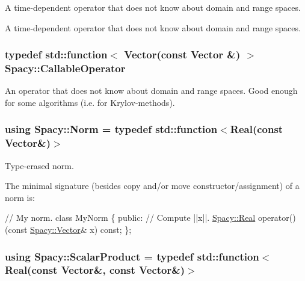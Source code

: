 A time-\/dependent operator that does not know about domain and range spaces. 

A time-\/dependent operator that does not know about domain and range spaces. \hypertarget{namespaceSpacy_a022a87afa759e18781dd2aea9a80cd73}{
\subsubsection[{Callable\-Operator}]{\setlength{\rightskip}{0pt plus 5cm}typedef std\-::function$<$ {\bf Vector}(const {\bf Vector} \&) $>$ {\bf Spacy\-::\-Callable\-Operator}}}\label{namespaceSpacy_a022a87afa759e18781dd2aea9a80cd73}
An operator that does not know about domain and range spaces. Good enough for some algorithms (i.\-e. for Krylov-\/methods). \hypertarget{namespaceSpacy_a0dbe77a4e1282ef88017e94d50d17791}{
\subsubsection[{Norm}]{\setlength{\rightskip}{0pt plus 5cm}using {\bf Spacy\-::\-Norm} = typedef std\-::function$<${\bf Real}(const {\bf Vector}\&)$>$}}\label{namespaceSpacy_a0dbe77a4e1282ef88017e94d50d17791}


Type-\/erased norm. 

The minimal signature (besides copy and/or move constructor/assignment) of a norm is\-: 
\begin{DoxyCode}
\textcolor{comment}{// My norm.}
\textcolor{keyword}{class }MyNorm
\{
\textcolor{keyword}{public}:
  \textcolor{comment}{// Compute ||x||.}
  \hyperlink{classSpacy_1_1Real}{Spacy::Real} operator()(\textcolor{keyword}{const} \hyperlink{classSpacy_1_1Vector}{Spacy::Vector}& x) \textcolor{keyword}{const};
\};
\end{DoxyCode}
 \hypertarget{namespaceSpacy_aa995526aa0e3fa58aca8dd6772311cad}{
\subsubsection[{Scalar\-Product}]{\setlength{\rightskip}{0pt plus 5cm}using {\bf Spacy\-::\-Scalar\-Product} = typedef std\-::function$<${\bf Real}(const {\bf Vector}\&, const {\bf Vector}\&)$>$}}\label{namespaceSpacy_aa995526aa0e3fa58aca8dd6772311cad}


